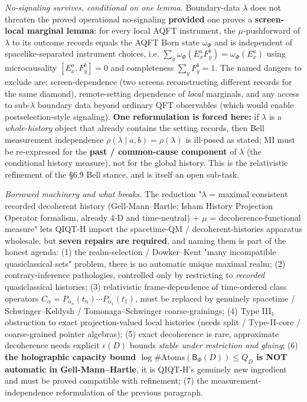 \documentclass[11pt,a4paper]{article}
\begin{document}
\emph{No-signaling survives, conditional on one lemma.} Boundary-data $\lambda$ does not threaten the proved operational no-signaling \textbf{provided} one proves a \textbf{screen-local marginal lemma}: for every local AQFT instrument, the $\mu$-pushforward of $\lambda$ to its outcome records equals the AQFT Born state $\omega_\Phi$ and is independent of spacelike-separated instrument choices, i.e. $\sum_y \omega_\Phi(E_x^a F_y^b) = \omega_\Phi(E_x^a)$ using microcausality $[E_x^a, F_y^b]=0$ and completeness $\sum_y F_y^b = 1$. The named dangers to exclude are: screen-dependence (two screens reconstructing different records for the same diamond), remote-setting dependence of \emph{local} marginals, and any access to sub-$\lambda$ boundary data beyond ordinary QFT observables (which would enable postselection-style signaling). \textbf{One reformulation is forced here:} if $\lambda$ is a \emph{whole-history} object that already contains the setting records, then Bell measurement independence $\rho(\lambda \mid a,b) = \rho(\lambda)$ is ill-posed as stated; MI must be re-expressed for the \textbf{past / common-cause component} of $\lambda$ (the conditional history measure), not for the global history. This is the relativistic refinement of the §6.9 Bell stance, and is itself an open sub-task.

\emph{Borrowed machinery and what breaks.} The reduction "$\lambda$ = maximal consistent recorded decoherent history (Gell-Mann–Hartle; Isham History Projection Operator formalism, already 4-D and time-neutral) + $\mu$ = decoherence-functional measure" lets QIQT-H import the spacetime-QM / decoherent-histories apparatus wholesale, but \textbf{seven repairs are required}, and naming them is part of the honest agenda: (1) the realm-selection / Dowker–Kent "many incompatible quasiclassical sets" problem, there is no automatic unique maximal realm; (2) contrary-inference pathologies, controlled only by restricting to \emph{recorded} quasiclassical histories; (3) relativistic frame-dependence of time-ordered class operators $C_\alpha = P_{\alpha_n}(t_n)\cdots P_{\alpha_1}(t_1)$, must be replaced by genuinely spacetime / Schwinger–Keldysh / Tomonaga–Schwinger coarse-grainings; (4) Type III$_1$ obstruction to exact projection-valued local histories (needs split / Type-II-core / coarse-grained pointer algebras); (5) exact decoherence is rare, approximate decoherence needs explicit $\epsilon(D)$ bounds \emph{stable under restriction and gluing}; (6) \textbf{the holographic capacity bound $\log \#\mathrm{Atoms}(\mathsf{B}_\Phi(D)) \le Q_D$ is NOT automatic in Gell-Mann–Hartle}, it is QIQT-H's genuinely new ingredient and must be proved compatible with refinement; (7) the measurement-independence reformulation of the previous paragraph.
\end{document}
